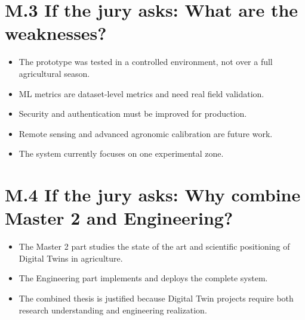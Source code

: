\section{M.3 If the jury asks: What are the weaknesses?}

\begin{itemize}

\item The prototype was tested in a controlled environment, not over a full agricultural season.

\item ML metrics are dataset-level metrics and need real field validation.

\item Security and authentication must be improved for production.

\item Remote sensing and advanced agronomic calibration are future work.

\item The system currently focuses on one experimental zone.

\end{itemize}

\section{M.4 If the jury asks: Why combine Master 2 and Engineering?}

\begin{itemize}

\item The Master 2 part studies the state of the art and scientific positioning of Digital Twins in agriculture.

\item The Engineering part implements and deploys the complete system.

\item The combined thesis is justified because Digital Twin projects require both research understanding and engineering realization.

\end{itemize}
